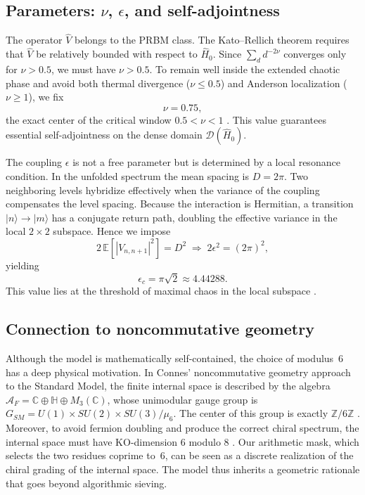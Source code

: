 \documentclass[aps,prl,preprint,superscriptaddress,floatfix]{revtex4-2}
\begin{document}
\subsection{Parameters: $\nu$, $\epsilon$, and self-adjointness}

The operator $\hat V$ belongs to the PRBM class. The Kato--Rellich theorem requires that $\hat V$ be relatively bounded with respect to $\hat H_0$. Since $\sum_d d^{-2\nu}$ converges only for $\nu>0.5$, we must have $\nu>0.5$. To remain well inside the extended chaotic phase and avoid both thermal divergence ($\nu\le0.5$) and Anderson localization ($\nu\ge1$), we fix
\begin{equation}
\nu = 0.75,
\end{equation}
the exact center of the critical window $0.5<\nu<1$ \cite{Mirlin1996}. This value guarantees essential self-adjointness on the dense domain $\mathcal{D}(\hat H_0)$.

The coupling $\epsilon$ is not a free parameter but is determined by a local resonance condition. In the unfolded spectrum the mean spacing is $D=2\pi$. Two neighboring levels hybridize effectively when the variance of the coupling compensates the level spacing. Because the interaction is Hermitian, a transition $|n\rangle\to|m\rangle$ has a conjugate return path, doubling the effective variance in the local $2\times2$ subspace. Hence we impose
\begin{equation}
2\,\mathbb{E}[|V_{n,n+1}|^2] = D^2 \;\Longrightarrow\; 2\epsilon^2 = (2\pi)^2,
\end{equation}
yielding
\begin{equation}
\boxed{\epsilon_c = \pi\sqrt{2} \approx 4.44288}.
\label{eq:epsilon}
\end{equation}
This value lies at the threshold of maximal chaos in the local subspace \cite{Cunden2018,Gross1980}.

\subsection{Connection to noncommutative geometry}

Although the model is mathematically self-contained, the choice of modulus~6 has a deep physical motivation. In Connes' noncommutative geometry approach to the Standard Model, the finite internal space is described by the algebra $\mathcal{A}_F = \mathbb{C}\oplus\mathbb{H}\oplus M_3(\mathbb{C})$, whose unimodular gauge group is $G_{SM} = U(1)\times SU(2)\times SU(3)/\mu_6$. The center of this group is exactly $\mathbb{Z}/6\mathbb{Z}$ \cite{Connes2008}. Moreover, to avoid fermion doubling and produce the correct chiral spectrum, the internal space must have KO-dimension $6$ modulo $8$ \cite{Chamseddine2007}. Our arithmetic mask, which selects the two residues coprime to~6, can be seen as a discrete realization of the chiral grading of the internal space. The model thus inherits a geometric rationale that goes beyond algorithmic sieving.
\end{document}
